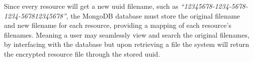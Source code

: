 Since every resource will get a new \acrshort{uuid} filename, such as \textit{``12345678-1234-5678-1234-567812345678''}, the MongoDB database must store the original filename and new filename for each resource, providing a mapping of each resource's filenames. Meaning a user may seamlessly view and search the original filenames, by interfacing with the database but upon retrieving a file the system will return the encrypted resource file through the stored \acrshort{uuid}.
